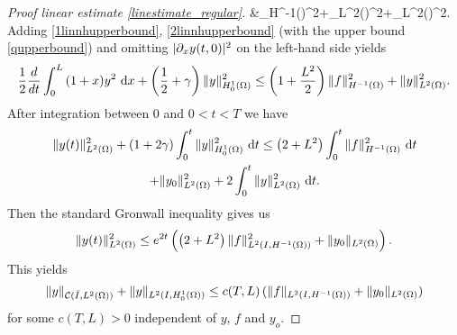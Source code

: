 \begin{proof}[Proof linear estimate \eqref{linestimate_regular}]
  &\leq {}_{H^{-1}(\Omega)}^{2}+_{L^{2}(\Omega)}^{2}+_{L^{2}(\Omega)}^{2}.
  \eeal
  Adding \eqref{1linnhupperbound}, \eqref{2linnhupperbound} (with the upper bound \eqref{qupperbound}) and omitting $\lvert\partial_{x} y(t,0)\rvert^{2}$ on the left-hand side yields
  \[
  \frac{1}{2}\frac{d}{dt}\int_{0}^{L}{(1+x)y^{2}~\mathrm dx} +\left(\frac{1}{2}+\gamma\right)\|y\|_{H^1_0(\Omega)}^2\leq \left(1 +\frac{L^{2}}{2}\right)\lVert f\rVert_{H^{-1}(\Omega)}^{2} + \|y\|_{L^2(\Omega)}^2.
  \]
  After integration between $0$ and $0<t<T$ we have
  \begin{multline*}
  \|y(t)\|_{L^2(\Omega)}^2+ \left( 1+2\gamma \right)\int_{0}^{t}{\|y\|_{H^1_0(\Omega)}^2~\mathrm dt}\leq \left(2+L^{2}\right)\int_{0}^{t}{\lVert f\rVert_{H^{-1}(\Omega)}^{2}~\mathrm dt}\\
  +\|y_{0}\|_{L^2(\Omega)}^2+2\int_0^t{\|y\|_{L^2(\Omega)}^2~\mathrm dt}.
  \end{multline*}
  Then the standard Gronwall inequality gives us
  \[
  \|y(t)\|_{L^2(\Omega)}^2  \leq e^{2t}\left(\left(2+L^{2}\right)\lVert f\rVert_{L^{2}(I,H^{-1}(\Omega))}^{2}+\lVert y_{0}\rVert_{L^{2}(\Omega)}\right).
  \]
  This yields
  \[
  \|y\|_{\mathcal C(\bar I,L^2(\Omega))}+\|y\|_{L^2(I,H^1_0(\Omega))}\leq c(T,L)\,(\|f\|_{\Hm1}+\|y_0\|_{L^2(\Omega)})
  \]
  for some $c(T,L)>0$ independent of $y$, $f$ and $y_o$.
\qquad\end{proof}

